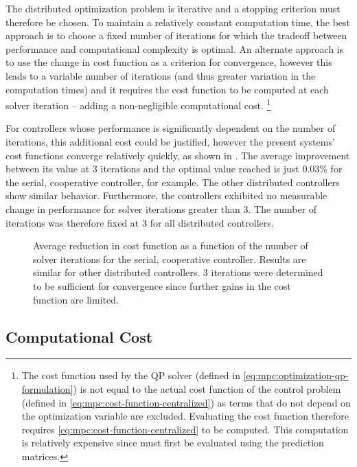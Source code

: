 The distributed optimization problem is iterative and a stopping criterion must therefore be chosen.
To maintain a relatively constant computation time, the best approach is to choose a fixed number of iterations for which the tradeoff between performance and computational complexity is optimal.
An alternate approach is to use the change in cost function as a criterion for convergence, however this leads to a variable number of iterations (and thus greater variation in the computation times) and it requires the cost function to be computed at each solver iteration -- adding a non-negligible computational cost.
\footnote{The cost function used by the QP solver (defined in \eqref{eq:mpc:optimization-qp-formulation}) is not equal to the actual cost function of the control problem (defined in \eqref{eq:mpc:cost-function-centralized}) as terms that do not depend on the optimization variable are excluded. Evaluating the cost function therefore requires \eqref{eq:mpc:cost-function-centralized} to be computed. This computation is relatively expensive since  must first be evaluated using the prediction matrices.}

For controllers whose performance is significantly dependent on the number of iterations, this additional cost could be justified, however the present systems' cost functions converge relatively quickly, as shown in .
The average improvement between its value at 3 iterations and the optimal value reached is just 0.03\% for the serial, cooperative controller, for example.
The other distributed controllers show similar behavior.
Furthermore, the controllers exhibited no measurable change in performance for solver iterations greater than 3.
The number of iterations was therefore fixed at 3 for all distributed controllers.


\begin{figure}
  \centering
  
  \caption[Average reduction in cost function as a function of the number of solver iterations.]{Average reduction in cost function as a function of the number of solver iterations for the serial, cooperative controller. Results are similar for other distributed controllers. 3 iterations were determined to be sufficient for convergence since further gains in the cost function are limited.}
  \label{fig:mpc:distributed:cost-function}
\end{figure}


\subsection{Computational Cost}

